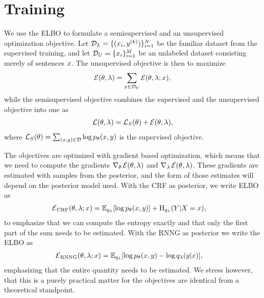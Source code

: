 \section{Training}
  We use the ELBO to formulate a semisupervised and an unsupervised optimization objective. Let $\mathcal{D}_L = \{ (x_i, y^{(k)})\}_{i=1}^N$ be the familiar dataset from the supervised training, and let $\mathcal{D}_U = \{ x_i \}_{i=1}^M$ be an unlabeled dataset consisting merely of sentences $x$. The unsupervised objective is then to maximize
  \begin{align}
    \operatorname{\mathcal{E}}(\theta, \lambda) = \sum_{ x \in \mathcal{D}_U } \operatorname{\mathcal{E}}(\theta, \lambda; x),
  \end{align}
  while the semisupervised objective combines the supervised and the unsupervised objective into one as
  \begin{align*}
    \operatorname{\mathcal{L}}(\theta, \lambda) = \operatorname{\mathcal{L}}_{S}(\theta) + \operatorname{\mathcal{E}}(\theta, \lambda),
  \end{align*}
  where $\operatorname{\mathcal{L}}_{S}(\theta) = \sum_{ (x, y) \in \mathcal{D} } \log p_{\theta}(x, y)$ is the supervised objective.

  The objectives are optimized with gradient based optimization, which means that we need to compute the gradients $\nabla_{\theta} \operatorname{\mathcal{E}}(\theta, \lambda)$ and $\nabla_{\lambda} \operatorname{\mathcal{E}}(\theta, \lambda)$. These gradients are estimated with samples from the posterior, and the form of those estimates will depend on the posterior model used. With the CRF as posterior, we write ELBO as
  \begin{align}
    \operatorname{\mathcal{E}}_{\text{CRF}}(\theta, \lambda; x)
      &= \operatorname{\mathbb{E}}_{q_{\lambda}} [ \log p_{\theta}( x, y ) ] + \operatorname{H}_{q_{\lambda}}(Y | X = x),
  \end{align}
  to emphasize that we can compute the entropy exactly and that only the first part of the sum needs to be estimated. With the RNNG as posterior we write the ELBO as
  \begin{align}
    \operatorname{\mathcal{E}}_{\text{RNNG}}(\theta, \lambda; x)
      &= \operatorname{\mathbb{E}}_{q_{\lambda}} [ \log p_{\theta}( x, y ) - \log q_{\lambda}(y | x) ],
  \end{align}
  emphasizing that the entire quantity needs to be estimated. We stress however, that this is a purely practical matter for the objectives are identical from a theoretical standpoint.


